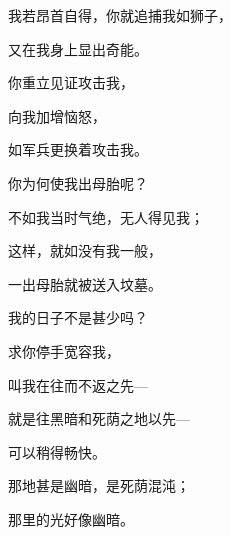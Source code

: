 {\par }{\Q {}我若昂首自得，你就追捕我如狮子，
\par }{\Q 又在我身上显出奇能。
\par }{\Q {}你重立见证攻击我，
\par }{\Q 向我加增恼怒，
\par }{\Q 如军兵更换着攻击我。
\par }{\BB \par }{\Q {}你为何使我出母胎呢？
\par }{\Q 不如我当时气绝，无人得见我；
\par }{\Q {}这样，就如没有我一般，
\par }{\Q 一出母胎就被送入坟墓。
\par }{\Q {}我的日子不是甚少吗？
\par }{\Q 求你停手宽容我，
\par }{\Q 叫我在往而不返之先—
\par }{\Q 就是往黑暗和死荫之地以先—
\par }{\Q 可以稍得畅快。
\par }{\Q {}那地甚是幽暗，是死荫混沌{}；
\par }{\Q 那里的光好像幽暗。

}
